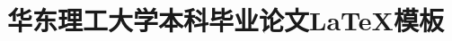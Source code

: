 \documentclass{ecustthesis}
\title{华东理工大学本科毕业论文\LaTeX{}模板}
\begin{document}
    
    \tableofcontents
    
    
    
    
    
    \bibsection
    
    
\end{document}
